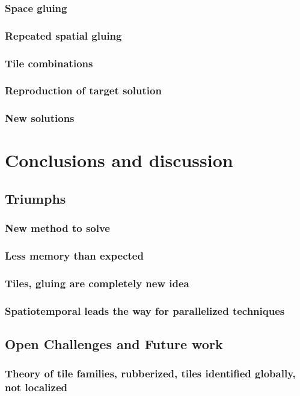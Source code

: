 \documentclass{article}
\begin{document}
			\subsubsection{Space gluing}
			\subsubsection{Repeated spatial gluing}
			\subsubsection{Tile combinations}
			\subsubsection{Reproduction of target solution}
			\subsubsection{New solutions}
			
	\section{Conclusions and discussion}
		\subsection{Triumphs}
			\subsubsection{New method to solve}
			\subsubsection{Less memory than expected}
			\subsubsection{Tiles, gluing are completely new idea}
            \subsubsection{Spatiotemporal leads the way for parallelized techniques}
		\subsection{Open Challenges and Future work}
			\subsubsection{Theory of tile families, rubberized, tiles identified globally,
                            not localized}
\end{document}

